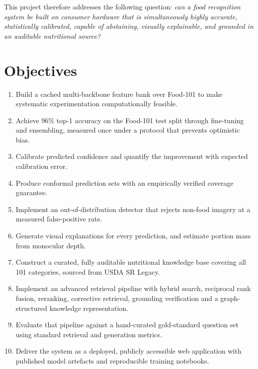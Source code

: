 \documentclass[12pt,a4paper,oneside]{report}
\begin{document}
\medskip
\noindent This project therefore addresses the following question: \emph{can a
food recognition system be built on consumer hardware that is simultaneously
highly accurate, statistically calibrated, capable of abstaining, visually
explainable, and grounded in an auditable nutritional source?}

\chapter{Objectives}

\begin{enumerate}
  \item Build a cached multi-backbone feature bank over Food-101 to make
  systematic experimentation computationally feasible.
  \item Achieve 96\% top-1 accuracy on the Food-101 test split through
  fine-tuning and ensembling, measured once under a protocol that prevents
  optimistic bias.
  \item Calibrate predicted confidence and quantify the improvement with
  expected calibration error.
  \item Produce conformal prediction sets with an empirically verified coverage
  guarantee.
  \item Implement an out-of-distribution detector that rejects non-food imagery
  at a measured false-positive rate.
  \item Generate visual explanations for every prediction, and estimate portion
  mass from monocular depth.
  \item Construct a curated, fully auditable nutritional knowledge base covering
  all 101 categories, sourced from USDA SR Legacy.
  \item Implement an advanced retrieval pipeline with hybrid search, reciprocal
  rank fusion, reranking, corrective retrieval, grounding verification and a
  graph-structured knowledge representation.
  \item Evaluate that pipeline against a hand-curated gold-standard question set
  using standard retrieval and generation metrics.
  \item Deliver the system as a deployed, publicly accessible web application
  with published model artefacts and reproducible training notebooks.
\end{enumerate}
\end{document}
